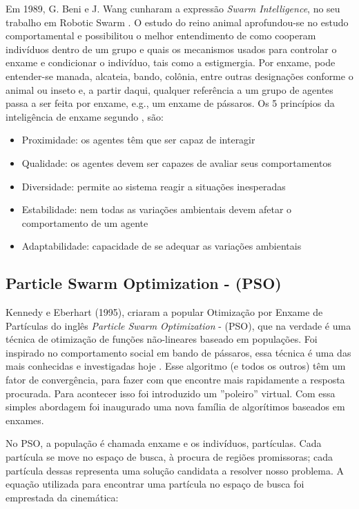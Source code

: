 \documentclass[conference,compsoc]{IEEEtran}
\begin{document}
Em 1989, G. Beni e J. Wang cunharam a expressão \textit{Swarm Intelligence}, no seu
trabalho em Robotic Swarm \cite{SRobotics}. O estudo do reino animal aprofundou-se no estudo
comportamental e possibilitou o melhor entendimento de como cooperam indivíduos dentro de um grupo e
quais os mecanismos usados para controlar o enxame e condicionar o indivíduo, tais como a estigmergia. 
Por enxame, pode entender-se manada, alcateia, bando, colônia, entre outras designações conforme o animal 
ou inseto e, a partir daqui, qualquer referência a um grupo de agentes passa a ser feita por enxame, e.g., 
um enxame de pássaros. Os 5 princípios da inteligência de enxame segundo \cite{chambers2014computer} \cite{chambers2014computer}, são:
\begin{itemize}
	\item{Proximidade: os agentes têm que ser capaz de interagir}
	\item{Qualidade: os agentes devem ser capazes de avaliar seus comportamentos}
	\item{Diversidade: permite ao sistema reagir a situações inesperadas}
	\item{Estabilidade: nem todas as variações ambientais devem afetar o comportamento de um agente}
	\item{Adaptabilidade: capacidade de se adequar as variações ambientais}
\end{itemize}


\subsection{Particle Swarm Optimization - (PSO)}\label{arte:algo:pso}

Kennedy e Eberhart (1995), criaram a popular Otimização por Enxame de Partículas do inglês \textit{Particle Swarm Optimization} - (PSO), 
que na verdade é uma técnica de otimização de funções não-lineares baseado em populações. Foi inspirado no comportamento
social em bando de pássaros, essa técnica é uma das mais conhecidas e investigadas hoje \cite{Kennedy1995}.
Esse algoritmo (e todos os outros) têm um fator de convergência, para fazer com que encontre mais rapidamente a resposta procurada.
Para acontecer isso foi introduzido um ''poleiro'' virtual. Com essa simples abordagem foi inaugurado uma nova
família de algorítimos baseados em enxames. 

No PSO, a população é chamada enxame e os indivíduos, partículas. Cada partícula se move no espaço de busca, 
à procura de regiões promissoras; cada partícula dessas representa uma solução candidata a resolver nosso problema.
A equação utilizada para encontrar uma partícula no espaço de busca foi emprestada da cinemática:
\end{document}
